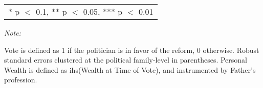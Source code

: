 \begin{table}[!h]
{\begin{threeparttable}
\begin{tabular}[t]{lcccccc}
\bottomrule
\multicolumn{7}{l}{\rule{0pt}{1em}* p $<$ 0.1, ** p $<$ 0.05, *** p $<$ 0.01}\\
\end{tabular}
\begin{tablenotes}[para]
\item \textit{Note: } 
\item Vote is defined as 1 if the politician is in favor of the reform, 0 otherwise. Robust standard errors clustered at the political family-level in parentheses. Personal Wealth is defined as ihs(Wealth at Time of Vote), and instrumented by Father's profession.
\end{tablenotes}
\end{threeparttable}}
\end{table}
